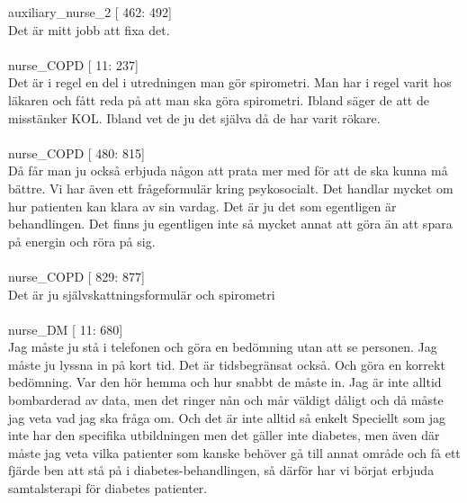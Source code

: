 \documentclass[12pt,a4paper,oneside]{article}
\begin{document}
 auxiliary\_nurse\_2 [ 462: 492]\\ 
Det {\"a}r mitt jobb att fixa det. %
\ \\\ \\
 nurse\_COPD [  11: 237]\\ 
Det {\"a}r i regel en del i utredningen man g{\"o}r spirometri. Man har i regel varit hos l{\"a}karen och f{\aa}tt reda p{\aa} att man ska g{\"o}ra spirometri. Ibland s{\"a}ger de att de misst{\"a}nker KOL. Ibland vet de ju det sj{\"a}lva d{\aa} de har varit r{\"o}kare. %
\ \\\ \\
 nurse\_COPD [ 480: 815]\\ 
D{\aa} f{\aa}r man ju ocks{\aa} erbjuda n{\aa}gon att prata mer med f{\"o}r att de ska kunna m{\aa} b{\"a}ttre. Vi har {\"a}ven ett fr{\aa}geformul{\"a}r kring psykosocialt. Det handlar mycket om hur patienten kan klara av sin vardag. Det {\"a}r ju det som egentligen {\"a}r behandlingen. Det finns ju egentligen inte s{\aa} mycket annat att g{\"o}ra {\"a}n att spara p{\aa} energin och r{\"o}ra p{\aa} sig. %
\ \\\ \\
 nurse\_COPD [ 829: 877]\\ 
Det {\"a}r ju sj{\"a}lvskattningsformul{\"a}r och spirometri %
\ \\\ \\
 nurse\_DM [  11: 680]\\ 
Jag m{\aa}ste ju st{\aa} i telefonen och g{\"o}ra en bed{\"o}mning utan att se personen. Jag m{\aa}ste ju lyssna in p{\aa} kort tid. Det {\"a}r tidsbegr{\"a}nsat ocks{\aa}. Och g{\"o}ra en korrekt bed{\"o}mning. Var den h{\"o}r hemma och hur snabbt de m{\aa}ste in. Jag {\"a}r inte alltid bombarderad av data, men det ringer n{\aa}n och m{\aa}r v{\"a}ldigt d{\aa}ligt och d{\aa} m{\aa}ste jag veta vad jag ska fr{\aa}ga om. Och det {\"a}r inte alltid s{\aa} enkelt Speciellt som jag inte har den specifika utbildningen men det g{\"a}ller inte diabetes, men {\"a}ven d{\"a}r m{\aa}ste jag veta vilka patienter som kanske beh{\"o}ver g{\aa} till annat omr{\aa}de och f{\aa} ett fj{\"a}rde ben att st{\aa} p{\aa} i diabetes-behandlingen, s{\aa} d{\"a}rf{\"o}r har vi b{\"o}rjat erbjuda samtalsterapi f{\"o}r diabetes patienter. %
\end{document}
